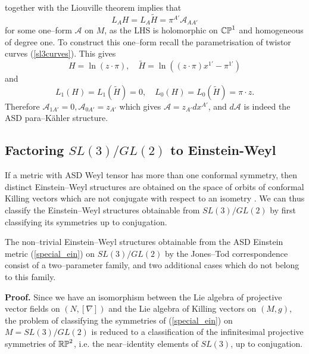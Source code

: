 together with the Liouville theorem
implies
that
\[
L_{A}H=L_{A}\widetilde{H}=\pi^{A'}\mathcal{A}_{AA'}
\]
for some one--form $\mathcal{A}$ on $M$, 
as the LHS is holomorphic on  $\mathbb{CP}^1$ and homogeneous of degree
one. To construct this one--form recall the parametrisation
of twistor curves (\ref{sl3curves}). This gives
\[
H=\ln{(z\cdot\pi)}, \quad\widetilde{H}=\ln{((z\cdot\pi)x^{1'}-\pi^{1'})}
\]
and
\[
L_{1}(H)=L_{1}(\widetilde{H})=0, \quad
L_{0}(H)=L_{0}(\widetilde{H})=\pi\cdot z.
\]
Therefore ${\mathcal A}_{1A'}=0, {\mathcal A}_{0A'}=z_{A'}$
which gives ${\mathcal A}=z_{A'}dx^{A'}$, and $d{\mathcal A}$
is indeed the ASD para--K\"ahler structure.
\subsection{Factoring $SL(3)/GL(2)$ to Einstein-Weyl}
\label{neat2}
If a metric with ASD Weyl tensor has more than one conformal symmetry, then distinct Einstein--Weyl structures are obtained on the space of orbits of conformal Killing vectors which are not conjugate with respect to an isometry \cite{PT}. We can thus classify the Einstein--Weyl structures obtainable from $SL(3)/GL(2)$ by first classifying its symmetries up to conjugation.
\begin{prop}
The non--trivial Einstein--Weyl structures obtainable from the ASD Einstein metric (\ref{special_ein}) on $SL(3)/GL(2)$ by the Jones--Tod correspondence consist of a two--parameter family, and two additional cases which do not belong to this family.
\end{prop}
\noindent
{\bf Proof. }Since we have an isomorphism between the Lie algebra of projective vector fields on $(N,[\nabla])$ and the Lie algebra of Killing vectors on $(M,g)$, the problem of classifying the symmetries of (\ref{special_ein}) on $M=SL(3)/GL(2)$ is reduced to a classification of the infinitesimal  projective symmetries of $\mathbb{RP}^2$, i.e. the near--identity elements of $SL(3)$, up to conjugation.

